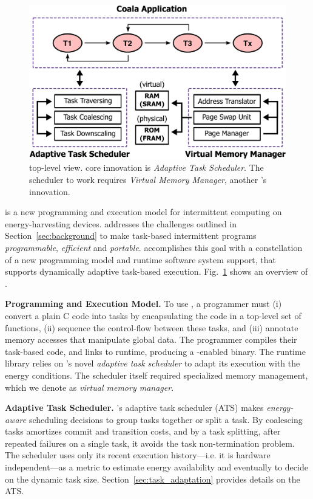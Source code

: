 \begin{figure}
	\centering
	\includegraphics[width=\columnwidth]{figures/overview.pdf}
	\caption{\sys top-level view. \sys core innovation is \emph{Adaptive Task Scheduler}. The scheduler to work requires \emph{Virtual Memory Manager}, another \sys's innovation. }
	\label{fig:system_overview}
\end{figure}
%
\sys is a new programming and execution model for intermittent computing on energy-harvesting devices. \sys addresses the challenges outlined in Section~\ref{sec:background} to make task-based intermittent programs {\em programmable}, {\em efficient} and {\em portable}. \sys accomplishes this goal with a constellation of a new programming model and runtime software system support, that supports dynamically adaptive task-based execution. Fig.~\ref{fig:system_overview} shows an overview of \sys.

\textbf{Programming and Execution Model.}  To use \sys, a programmer must (i) convert a plain C code into tasks by encapsulating the code in a top-level set of functions, (ii) sequence the control-flow between these tasks, and (iii) annotate memory accesses that manipulate global data. The programmer compiles their task-based code, and links to \sys runtime, producing a \sys-enabled binary. The runtime library relies on \sys's novel {\em adaptive task scheduler} to adapt its execution with the energy conditions. The scheduler itself required specialized memory management, which we denote as {\em virtual memory manager}.

\textbf{Adaptive Task Scheduler.} \sys's adaptive task scheduler (ATS) makes \emph{energy-aware} scheduling decisions to group tasks together or split a task. By coalescing tasks \sys amortizes commit and transition costs, and by a task splitting, after repeated failures on a single task, it avoids the task non-termination problem. The scheduler uses only its recent execution history---i.e. it is hardware independent---as a metric to estimate energy availability and eventually to decide on the dynamic task size. Section~\ref{sec:task_adaptation} provides details on the ATS.


